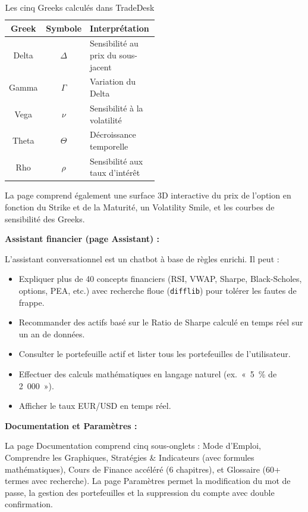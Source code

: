 \documentclass[a4paper, 12pt, twoside]{article}
\begin{document}
\begin{table}[h]
\begin{center}
\begin{tabular}{|c|c|p{0.5\linewidth}|}
\hline
\textbf{Greek} & \textbf{Symbole} & \textbf{Interprétation} \\
\hline
Delta & $\Delta$ & Sensibilité au prix du sous-jacent \\
\hline
Gamma & $\Gamma$ & Variation du Delta \\
\hline
Vega  & $\nu$    & Sensibilité à la volatilité \\
\hline
Theta & $\Theta$ & Décroissance temporelle \\
\hline
Rho   & $\rho$   & Sensibilité aux taux d'intérêt \\
\hline
\end{tabular}
\end{center}
\caption{Les cinq Greeks calculés dans TradeDesk}
\label{tab:greeks}
\end{table}

La page comprend également une surface 3D interactive du prix de
l'option en fonction du Strike et de la Maturité, un Volatility Smile,
et les courbes de sensibilité des Greeks.

\textbf{Assistant financier (page Assistant) :}

L'assistant conversationnel est un chatbot à base de règles enrichi. Il
peut :

\begin{itemize}
    \item Expliquer plus de 40 concepts financiers (RSI, VWAP, Sharpe,
          Black-Scholes, options, PEA, etc.) avec recherche floue
          (\texttt{difflib}) pour tolérer les fautes de frappe.
    \item Recommander des actifs basé sur le Ratio de Sharpe calculé
          en temps réel sur un an de données.
    \item Consulter le portefeuille actif et lister tous les
          portefeuilles de l'utilisateur.
    \item Effectuer des calculs mathématiques en langage naturel
          (ex.~«~5~\% de 2~000~»).
    \item Afficher le taux EUR/USD en temps réel.
\end{itemize}

\textbf{Documentation et Paramètres :}

La page Documentation comprend cinq sous-onglets : Mode d'Emploi,
Comprendre les Graphiques, Stratégies \& Indicateurs (avec formules
mathématiques), Cours de Finance accéléré (6 chapitres), et Glossaire
(60+ termes avec recherche). La page Paramètres permet la modification
du mot de passe, la gestion des portefeuilles et la suppression du
compte avec double confirmation.
\end{document}

